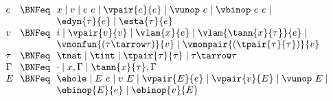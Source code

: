 \begin{flushleft}

\\
$\begin{array}{l@{~~}c@{~~}l}
  e & \BNFeq & x \mid v \mid e~e \mid \vpair{e}{e} \mid \vunop~e \mid \vbinop~e~e \mid
\\ & & \edyn{\tau}{e} \mid \esta{\tau}{e}
\\
  v & \BNFeq & i \mid \vpair{v}{v} \mid \vlam{x}{e} \mid \vlam{\tann{x}{\tau}}{e} \mid
\\ & & \vmonfun{(\tau\tarrow\tau)}{v} \mid \vmonpair{(\tpair{\tau}{\tau})}{v}
\\
  \tau & \BNFeq & \tnat \mid \tint \mid \tpair{\tau}{\tau} \mid \tau \tarrow \tau
\\
  \Gamma & \BNFeq & \cdot \mid x,\Gamma \mid \tann{x}{\tau},\Gamma
\\
  E & \BNFeq & \ehole \mid E~e \mid v~E \mid
                  \vpair{E}{e} \mid \vpair{v}{E} \mid \vunop~E \mid
\\ & &            \ebinop{E}{e} \mid \ebinop{v}{E}
\end{array}$



\end{flushleft}
